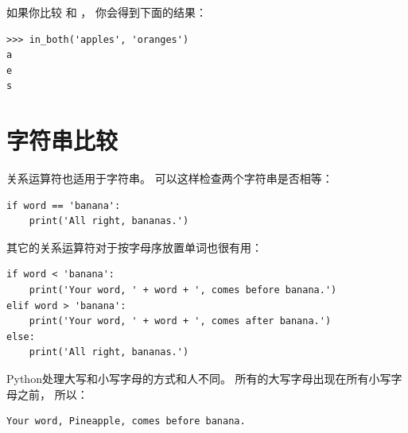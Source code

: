 
如果你比较  和 ， 你会得到下面的结果：

\begin{lstlisting}
>>> in_both('apples', 'oranges')
a
e
s
\end{lstlisting}

%

\section{字符串比较}
  


关系运算符也适用于字符串。  可以这样检查两个字符串是否相等：

\begin{lstlisting}
if word == 'banana':
    print('All right, bananas.')
\end{lstlisting}

%

其它的关系运算符对于按字母序放置单词也很有用：

\begin{lstlisting}
if word < 'banana':
    print('Your word, ' + word + ', comes before banana.')
elif word > 'banana':
    print('Your word, ' + word + ', comes after banana.')
else:
    print('All right, bananas.')
\end{lstlisting}

%

Python处理大写和小写字母的方式和人不同。  所有的大写字母出现在所有小写字母之前， 所以：

\begin{lstlisting}
Your word, Pineapple, comes before banana.
\end{lstlisting}

%

